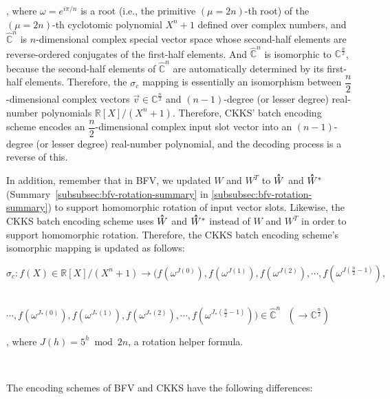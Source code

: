 , where $\omega = e^{i\pi/n}$ is a root (i.e., the primitive $(\mu=2n)$-th root) of the $(\mu=2n)$-th cyclotomic polynomial $X^n + 1$ defined over complex numbers, and $\mathbb{\hat{C}}^{n}$ is $n$-dimensional complex special vector space whose second-half elements are reverse-ordered conjugates of the first-half elements. And $\mathbb{\hat{C}}^{n}$ is isomorphic to $\mathbb{{C}}^{\frac{n}{2}}$, because the second-half elements of $\mathbb{\hat{C}}^{n}$ are automatically determined by its first-half elements. Therefore, the $\sigma_c$ mapping is essentially an isomorphism between $\dfrac{n}{2}$-dimensional complex vectors $\vec{v} \in \mathbb{C}^{\frac{n}{2}}$ and $(n-1)$-degree (or lesser degree) real-number polynomials $\mathbb{R}[X] / (X^n + 1)$. Therefore, CKKS' batch encoding scheme encodes an $\dfrac{n}{2}$-dimensional complex input slot vector into an $(n-1)$-degree (or lesser degree) real-number polynomial, and the decoding process is a reverse of this. 

In addition, remember that in BFV, we updated $W$ and $W^T$ to $\hathat W$ and $\hathat W^*$ (Summary~\ref*{subsubsec:bfv-rotation-summary} in \autoref{subsubsec:bfv-rotation-summary}) to support homomorphic rotation of input vector slots. Likewise, the CKKS batch encoding scheme uses $\hathat W$ and $\hathat W^*$ instead of $W$ and $W^T$ in order to support homomorphic rotation. Therefore, the CKKS batch encoding scheme's isomorphic mapping is updated as follows:


$\sigma_c: f(X) \in \mathbb{R}[X]/(X^n + 1) \longrightarrow \bm ( f(\omega^{J(0)}),f(\omega^{J(1)}),f(\omega^{J(2)}), \cdots, f(\omega^{J(\frac{n}{2} - 1)}), $

\textcolor{white}{$ f(X) \in \mathbb{R}[X]/(X^n + 1) \longrightarrow \bm ( $} $\cdots, f(\omega^{J_*(0)}),f(\omega^{J_*(1)}),f(\omega^{J_*(2)}), \cdots, f(\omega^{J_*(\frac{n}{2} - 1)}) \bm) \in \mathbb{\hat{C}}^{n} \text{ } (\longrightarrow \mathbb{C}^{\frac{n}{2}})$

, where $J(h) = 5^h \bmod 2n$, a rotation helper formula.  


$ $

The encoding schemes of BFV and CKKS have the following differences: 

